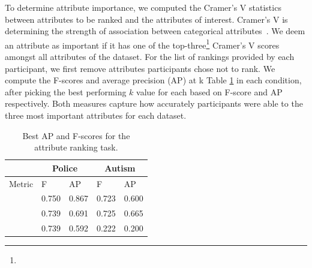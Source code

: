 To determine  attribute importance,
we computed the Cramer's V statistics
between attributes to be ranked
and the attributes of interest.
Cramer's V is 
determining
the strength of association between categorical attributes~\cite{McHugh2013}. We deem an attribute as important if it has one
of the top-three\footnote{} Cramer's V scores amongst all attributes of the dataset.
For the list of rankings provided by each participant,
we first remove attributes  participants chose not to rank.
We compute the F-scores and average precision (AP) at k
Table \ref{table:ranking_results}  in each condition, after picking the best performing $k$ value for each  based on F-score and AP respectively. Both measures capture how accurately participants were able to 
the three most important attributes for each dataset.
\begin{table}[ht!]
	\centering
	\vspace{-10pt}
	\begin{tabular}{l|ll|ll}
	         & \multicolumn{2}{c|}{Police}                                  & \multicolumn{2}{c}{Autism}                                   \\ \hline
	Metric   & F                             & AP                            & F                             & AP                            \\ \hline
	\system  & \cellcolor{blue!25}0.750 & \cellcolor{blue!25}0.867 & 0.723                         & 0.600                         \\
	\cluster & 0.739                         & 0.691                         & \cellcolor{blue!25}0.725 & \cellcolor{blue!25}0.665 \\
	\BFS     & 0.739                         & 0.592                         & 0.222                         & 0.200                         \\
	\end{tabular}
	\caption{Best AP and F-scores for the attribute ranking task.}
	\label{table:ranking_results}
	\vspace{-20pt}
\end{table}
